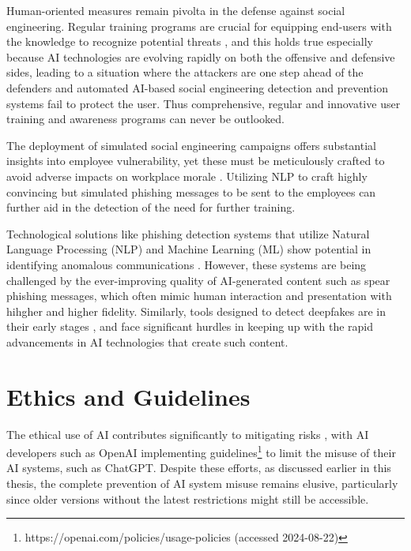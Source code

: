 Human-oriented measures remain pivolta in the defense against social engineering. Regular training programs are crucial for equipping end-users with the knowledge to recognize potential threats \citep{hadnagySocialEngineering2018}, and this holds true especially because AI technologies are evolving rapidly on both the offensive and defensive sides, leading to a situation where the attackers are one step ahead of the defenders and automated AI-based social engineering detection and prevention systems fail to protect the user.  Thus comprehensive, regular and innovative user training and awareness programs can never be outlooked.

The deployment of simulated social engineering campaigns offers substantial insights into employee vulnerability, yet these must be meticulously crafted to avoid adverse impacts on workplace morale \citep{mitnickArtDeceptionControlling2003}. Utilizing NLP to craft highly convincing but simulated phishing messages to be sent to the employees can further aid in the detection of the need for further training.

Technological solutions like phishing detection systems that utilize Natural Language Processing (NLP) and Machine Learning (ML) show potential in identifying anomalous communications \citep{basitComprehensiveSurveyAIenabledPhishingAttacks2021}. However, these systems are being challenged by the ever-improving quality of AI-generated content such as spear phishing messages, which often mimic human interaction and presentation with hihgher and higher fidelity. Similarly, tools designed to detect deepfakes are in their early stages \citep{mirskyTheCreationAndDetectionOfDeepfakes2021}, and face significant hurdles in keeping up with the rapid advancements in AI technologies that create such content.

\section{Ethics and Guidelines}

The ethical use of AI contributes significantly to mitigating risks \citep{guptaFromChatGPTtoThreatGPT2023}, with AI developers such as OpenAI implementing guidelines\footnote{https://openai.com/policies/usage-policies (accessed 2024-08-22)} to limit the misuse of their AI systems, such as ChatGPT. Despite these efforts, as discussed earlier in this thesis, the complete prevention of AI system misuse remains elusive, particularly since older versions without the latest restrictions might still be accessible.

